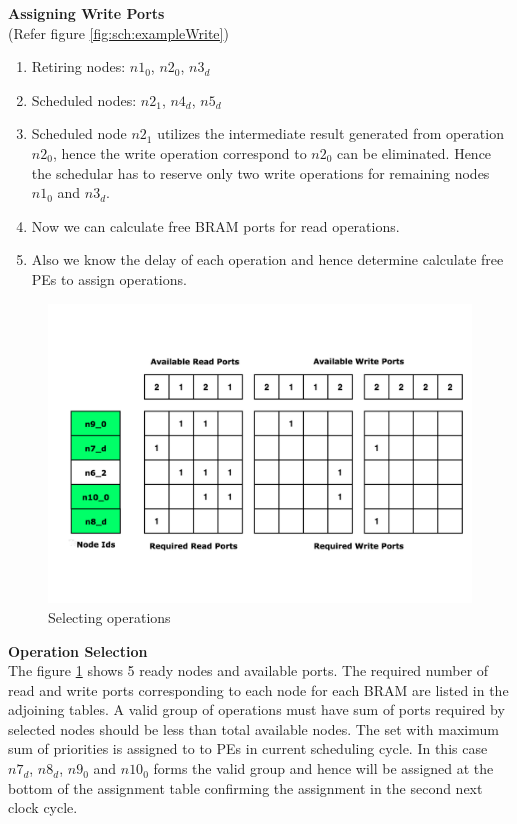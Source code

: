 \textbf{Assigning Write Ports} \\
(Refer figure \ref{fig:sch:exampleWrite})
\begin{enumerate}
    \item Retiring nodes: $n1_0$, $n2_0$, $n3_d$
    \item Scheduled nodes: $n2_1$, $n4_d$, $n5_d$
    \item Scheduled node $n2_1$ utilizes the intermediate result generated from operation $n2_0$, hence the 
        write operation correspond to $n2_0$ can be eliminated. Hence the schedular has to reserve 
        only two write operations for remaining nodes $n1_0$ and $n3_d$.
    \item Now we can calculate free BRAM ports for read operations.
    \item Also we know the delay of each operation and hence determine calculate free PEs
        to assign operations.
\end{enumerate}

\begin{figure}
    \centering
    \includegraphics[width = 0.8\linewidth]{./Scheduler/examplePortSelection.pdf}
    \caption{Selecting operations}
    \label{fig:sch:exampleSelectPorts}
\end{figure}

\textbf{Operation Selection} \\
The figure \ref{fig:sch:exampleSelectPorts} shows 5 ready nodes and available ports.
The required number of read and write ports corresponding to each node for each BRAM are listed 
in the adjoining tables. A valid group of operations must have sum of ports required by selected nodes
should be less than total available nodes. The set with maximum sum of priorities
is assigned to to PEs in current scheduling cycle. In this case $n7_d$, $n8_d$, $n9_0$ and $n10_0$
forms the valid group and hence will be assigned at the bottom of the assignment table confirming the assignment in 
the second next clock cycle.
\\



